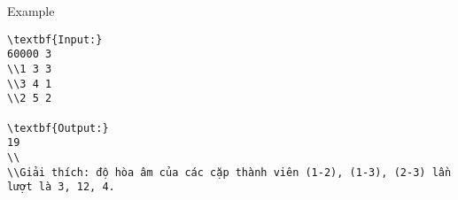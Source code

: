 Example  
\begin{verbatim}
\textbf{Input:}
60000 3
\\1 3 3
\\3 4 1
\\2 5 2

\textbf{Output:}
19
\\
\\Giải thích: độ hòa âm của các cặp thành viên (1-2), (1-3), (2-3) lần lượt là 3, 12, 4. \end{verbatim}